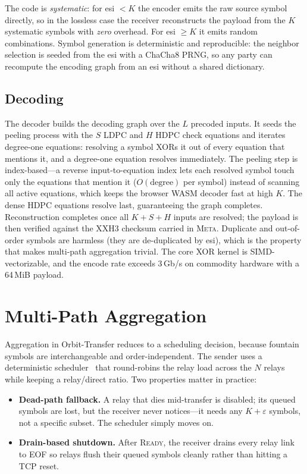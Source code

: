 \documentclass[conference]{IEEEtran}
\begin{document}
The code is \emph{systematic}: for esi $<K$ the encoder emits the raw source
symbol directly, so in the lossless case the receiver reconstructs the payload
from the $K$ systematic symbols with \emph{zero} overhead. For esi $\ge K$ it
emits random combinations. Symbol generation is deterministic and
reproducible: the neighbor selection is seeded from the esi with a
ChaCha8 PRNG, so any party can recompute the encoding graph from an esi
without a shared dictionary.

\subsection{Decoding}
The decoder builds the decoding graph over the $L$ precoded inputs. It seeds
the peeling process with the $S$ LDPC and $H$ HDPC check equations and iterates
degree-one equations: resolving a symbol XORs it out of every equation that
mentions it, and a degree-one equation resolves immediately. The peeling step
is index-based---a reverse input-to-equation index lets each resolved symbol
touch only the equations that mention it ($O(\text{degree})$ per symbol)
instead of scanning all active equations, which keeps the browser WASM decoder
fast at high $K$. The dense HDPC
equations resolve last, guaranteeing the graph completes. Reconstruction
completes once all $K+S+H$ inputs are resolved; the payload is then verified
against the XXH3 checksum carried in \textsc{Meta}. Duplicate and out-of-order
symbols are harmless (they are de-duplicated by esi), which is the property
that makes multi-path aggregation trivial. The core XOR kernel is
SIMD-vectorizable, and the encode rate exceeds $3$\,Gb/s on commodity hardware
with a 64\,MiB payload.

\section{Multi-Path Aggregation}
\label{sec:agg}

Aggregation in Orbit-Transfer reduces to a scheduling decision, because
fountain symbols are interchangeable and order-independent. The sender uses a
deterministic scheduler~\cite{maymounkov2002online} that round-robins the relay
load across the $N$ relays while keeping a relay/direct ratio. Two properties
matter in practice:
\begin{itemize}
\item \textbf{Dead-path fallback.} A relay that dies mid-transfer is disabled;
its queued symbols are lost, but the receiver never notices---it needs any
$K+\varepsilon$ symbols, not a specific subset. The scheduler simply moves on.
\item \textbf{Drain-based shutdown.} After \textsc{Ready}, the receiver drains
every relay link to EOF so relays flush their queued symbols cleanly rather
than hitting a TCP reset.
\end{itemize}
\end{document}
